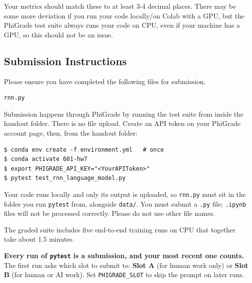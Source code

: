\documentclass[11pt,addpoints,answers]{exam}
\begin{document}
Your metrics should match these to at least 3-4 decimal places. There may be some more deviation if you run your code locally/on Colab with a GPU, but the PhiGrade test suite always runs your code on CPU, even if your machine has a GPU, so this should not be an issue.

\subsection{Submission Instructions}

Please ensure you have completed the following files for submission.

\begin{verbatim}
rnn.py
\end{verbatim}

Submission happens through PhiGrade by running the test suite from inside the handout folder. There is no file upload. Create an API token on your PhiGrade account page, then, from the handout folder:

\begin{lstlisting}[language=Shell]
$ conda env create -f environment.yml   # once
$ conda activate 601-hw7
$ export PHIGRADE_API_KEY="<YourAPIToken>"
$ pytest test_rnn_language_model.py
\end{lstlisting}

Your code runs locally and only its output is uploaded, so \texttt{rnn.py} must sit in the folder you run \lstinline{pytest} from, alongside \lstinline{data/}. You must submit a \texttt{.py} file; \texttt{.ipynb} files will not be processed correctly. Please do not use other file names.

The graded suite includes five end-to-end training runs on CPU that together take about 1.5 minutes.

\textbf{Every run of \lstinline{pytest} is a submission, and your most recent one counts.} The first run asks which slot to submit to:
\textbf{Slot A} (for human work only) or \textbf{Slot B} (for human or AI
work). Set \lstinline{PHIGRADE_SLOT} to skip the prompt on later runs.
\end{document}
